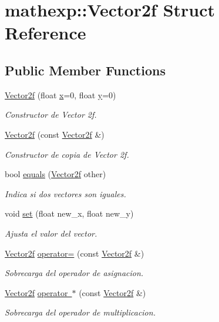 \hypertarget{structmathexp_1_1_vector2f}{}\section{mathexp\+::Vector2f Struct Reference}
\label{structmathexp_1_1_vector2f}
\subsection*{Public Member Functions}
\begin{DoxyCompactItemize}
\item 
\mbox{\hyperlink{structmathexp_1_1_vector2f_a13ca2a083824bbe2641d406952dcf307}{Vector2f}} (float \mbox{\hyperlink{structmathexp_1_1_vector2f_a23439427fa69b2e7cd68101c960ccffd}{x}}=0, float \mbox{\hyperlink{structmathexp_1_1_vector2f_ac757b6e37f124a0d6719c0bcb01207ad}{y}}=0)
\begin{DoxyCompactList}\small\item\em Constructor de Vector 2f. \end{DoxyCompactList}\item 
\mbox{\hyperlink{structmathexp_1_1_vector2f_a6f105df3d3ca322b6e28d91ae2d1daea}{Vector2f}} (const \mbox{\hyperlink{structmathexp_1_1_vector2f}{Vector2f}} \&)
\begin{DoxyCompactList}\small\item\em Constructor de copia de Vector 2f. \end{DoxyCompactList}\item 
bool \mbox{\hyperlink{structmathexp_1_1_vector2f_a0d6281bb4b05182c08dab761b9703d87}{equals}} (\mbox{\hyperlink{structmathexp_1_1_vector2f}{Vector2f}} other)
\begin{DoxyCompactList}\small\item\em Indica si dos vectores son iguales. \end{DoxyCompactList}\item 
void \mbox{\hyperlink{structmathexp_1_1_vector2f_a5d1771f3355882d88cc7cd100b9d76f1}{set}} (float new\+\_\+x, float new\+\_\+y)
\begin{DoxyCompactList}\small\item\em Ajusta el valor del vector. \end{DoxyCompactList}\item 
\mbox{\hyperlink{structmathexp_1_1_vector2f}{Vector2f}} \mbox{\hyperlink{structmathexp_1_1_vector2f_ad45318e0247e236fcfe3a07dc17088f8}{operator=}} (const \mbox{\hyperlink{structmathexp_1_1_vector2f}{Vector2f}} \&)
\begin{DoxyCompactList}\small\item\em Sobrecarga del operador de asignacion. \end{DoxyCompactList}\item 
\mbox{\hyperlink{structmathexp_1_1_vector2f}{Vector2f}} \mbox{\hyperlink{structmathexp_1_1_vector2f_aa746c49d06e2ce59bfd8f2d2645f7c87}{operator $\ast$}} (const \mbox{\hyperlink{structmathexp_1_1_vector2f}{Vector2f}} \&)
\begin{DoxyCompactList}\small\item\em Sobrecarga del operador de multiplicacion. \end{DoxyCompactList}\end{DoxyCompactItemize}
